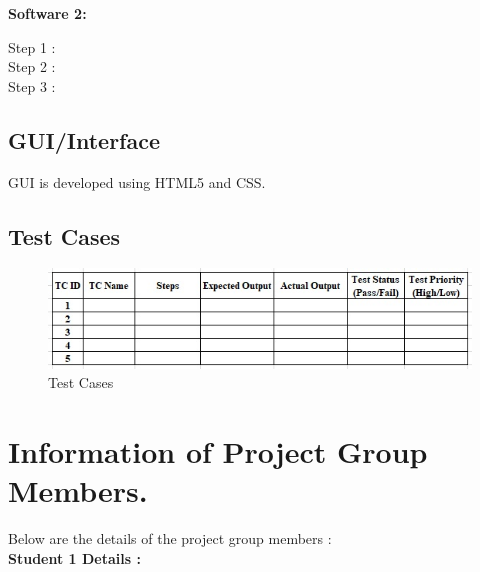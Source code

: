 \documentclass{report} %
\begin{document}
\begin{appendices}
		\flushleft
		\textbf{Software  2:}
		\begin{description}
			\item [Step 1 :] 
			\item [Step 2 :] 
			\item [Step 3 :] 
		\end{description}
				
		\section{GUI/Interface}
		GUI is developed using HTML5 and CSS.
		
		\section{Test Cases}
		\begin{figure}[h]
			\centering
			\includegraphics{images/testcases.jpg}
			\caption{Test Cases}
		\end{figure}
		
	\chapter{Information of Project Group Members.}
	\pagebreak
	\vspace*{0.5cm}
	Below are the details of the project group members : \\
	\textbf{Student 1 Details :}
	\vspace{0.5cm}
		

\end{appendices}
\end{document}
